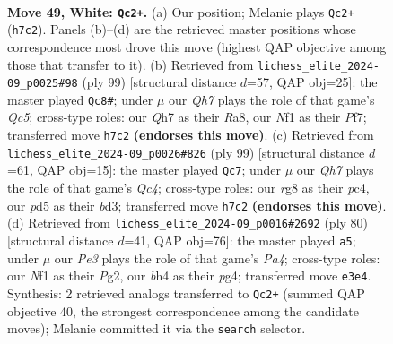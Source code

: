 \documentclass[11pt]{article}
\begin{document}
\clearpage

\begin{figure}[p]\centering
\begin{subfigure}{0.46\textwidth}\centering
\resizebox{\linewidth}{!}{%
\newchessgame
\chessboard[
  setfen={r5r1/p1k3pQ/7p/3p3P/pq1P2Pb/4P3/6K1/5N2 w - - 6 49},
  showmover=false,
  pgfstyle=straightmove, color=movearrow, markmove={h7-c2}
]}
\caption{}
\end{subfigure}\hfill
\begin{subfigure}{0.46\textwidth}\centering
\resizebox{\linewidth}{!}{%
\newchessgame
\chessboard[
  setfen={r6k/PK3pp1/1B1p3p/4p3/2q1P3/5P2/8/R4R2 b - - 2 50},
  showmover=false,
  pgfstyle=straightmove, color=movearrow, markmove={c4-c8}
]}
\caption{}
\end{subfigure}
\\[4pt]
\begin{subfigure}{0.46\textwidth}\centering
\resizebox{\linewidth}{!}{%
\newchessgame
\chessboard[
  setfen={8/4kpp1/4p2p/2q4P/2P5/3B4/R4PP1/1R4K1 b - - 2 50},
  showmover=false,
  pgfstyle=straightmove, color=movearrow, markmove={c5-c7}
]}
\caption{}
\end{subfigure}\hfill
\begin{subfigure}{0.46\textwidth}\centering
\resizebox{\linewidth}{!}{%
\newchessgame
\chessboard[
  setfen={8/p3r3/8/1P1k3p/P5pP/3pr1P1/3Q2P1/6K1 w - - 4 41},
  showmover=false,
  pgfstyle=straightmove, color=movearrow, markmove={a4-a5}
]}
\caption{}
\end{subfigure}
\caption{\textbf{Move 49, White: \texttt{Qc2+}.} (a) Our position; Melanie plays \texttt{Qc2+} (\texttt{h7c2}). Panels (b)--(d) are the retrieved master positions whose correspondence most drove this move (highest QAP objective among those that transfer to it). (b) Retrieved from \texttt{lichess\_elite\_2024-09\_p0025\#98} (ply 99) [structural distance $d$=57, QAP obj=25]: the master played \texttt{Qc8\#}; under $\mu$ our \emph{Qh7} plays the role of that game's \emph{Qc5}; cross-type roles: our \emph{Q}h7 as their \emph{R}a8, our \emph{N}f1 as their \emph{P}f7; transferred move \texttt{h7c2} \textbf{(endorses this move)}. (c) Retrieved from \texttt{lichess\_elite\_2024-09\_p0026\#826} (ply 99) [structural distance $d$=61, QAP obj=15]: the master played \texttt{Qc7}; under $\mu$ our \emph{Qh7} plays the role of that game's \emph{Qc4}; cross-type roles: our \emph{r}g8 as their \emph{p}c4, our \emph{p}d5 as their \emph{b}d3; transferred move \texttt{h7c2} \textbf{(endorses this move)}. (d) Retrieved from \texttt{lichess\_elite\_2024-09\_p0016\#2692} (ply 80) [structural distance $d$=41, QAP obj=76]: the master played \texttt{a5}; under $\mu$ our \emph{Pe3} plays the role of that game's \emph{Pa4}; cross-type roles: our \emph{N}f1 as their \emph{P}g2, our \emph{b}h4 as their \emph{p}g4; transferred move \texttt{e3e4}. Synthesis: 2 retrieved analogs transferred to \texttt{Qc2+} (summed QAP objective 40, the strongest correspondence among the candidate moves); Melanie committed it via the \texttt{search} selector.}
\label{fig:thought-m96}
\end{figure}
\end{document}
